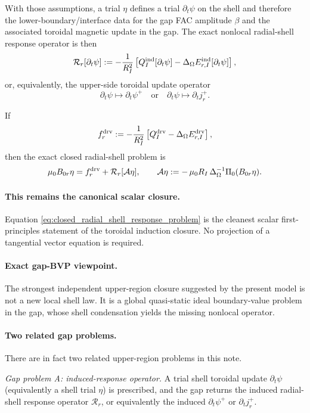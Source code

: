 \documentclass[11pt,a4paper]{article}
\begin{document}
With those assumptions, a trial $\eta$ defines a trial $\partial_t\psi$ on the
shell and therefore the lower-boundary/interface data for the gap FAC
amplitude \(\beta\) and the associated toroidal magnetic update in the gap.
The exact nonlocal radial-shell response operator is then
\begin{equation}
\mathcal R_r[\partial_t\psi]
:=
-\frac{1}{R_I^2}
\left[
Q_I^{\rm ind}[\partial_t\psi]
- \Delta_\Omega E_{r,I}^{\rm ind}[\partial_t\psi]
\right],
\label{eq:radial_response_operator}
\end{equation}
or, equivalently, the upper-side toroidal update operator
\[
\partial_t\psi \mapsto \partial_t\psi^+
\quad\text{or}\quad
\partial_t\psi \mapsto \partial_t j_r^+.
\]

If
\[
f_r^{\rm drv}
:=
-\frac{1}{R_I^2}
\left[
Q_I^{\rm drv} - \Delta_\Omega E_{r,I}^{\rm drv}
\right],
\]
then the exact closed radial-shell problem is
\begin{equation}
\mu_0 B_{0r}\eta
=
f_r^{\rm drv}
+
\mathcal R_r[\mathcal A\eta],
\qquad
\mathcal A\eta
:=
-\,\mu_0 R_I\,\Delta_\Omega^{-1}\Pi_0(B_{0r}\eta).
\label{eq:closed_radial_shell_response_problem}
\end{equation}

\paragraph{This remains the canonical scalar closure.}
Equation \eqref{eq:closed_radial_shell_response_problem} is the cleanest
scalar first-principles statement of the toroidal induction closure. No
projection of a tangential vector equation is required.

\paragraph{Exact gap-BVP viewpoint.}
The strongest independent upper-region closure suggested by the present model
is not a new local shell law. It is a global quasi-static ideal
boundary-value problem in the gap, whose shell condensation yields the missing
nonlocal operator.

\paragraph{Two related gap problems.}
There are in fact two related upper-region problems in this note.

\emph{Gap problem A: induced-response operator.}
A trial shell toroidal update \(\partial_t\psi\) (equivalently a shell trial
\(\eta\)) is prescribed, and the gap returns the induced radial-shell response
operator \(\mathcal R_r\), or equivalently the induced \(\partial_t\psi^+\) or
\(\partial_t j_r^+\).
\end{document}
